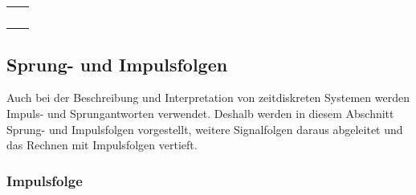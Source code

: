 \begin{table}[H]
{\begin{tabular}{| l | l |}
\parbox[c][0.8in][c]{3in}{} & 
\parbox[c][0.8in][c]{3in}{}\\ \hline

\parbox[c][0.64in][c]{3in}{} 
& \parbox[c][0.64in][c]{3in}{}\\ \hline

\parbox[c][0.64in][c]{3in}{} & \parbox[c][0.64in][c]{3in}{}\\ \hline

\parbox[c][0.64in][c]{3in}{} & 
\parbox[c][0.64in][c]{3in}{}\\ \hline

\parbox[c][0.64in][c]{3in}{} & \parbox[c][0.64in][c]{3in}{}\\ \hline

\parbox[c][0.64in][c]{3in}{} & \parbox[c][0.64in][c]{3in}{}\\ \hline

\end{tabular}%
}
\label{tab:threeone}
\end{table}

\clearpage

\subsection{Sprung- und Impulsfolgen}

\noindent Auch bei der Beschreibung und Interpretation von zeitdiskreten Systemen werden Impuls- und Sprungantworten verwendet. Deshalb werden in diesem Abschnitt Sprung- und Impulsfolgen vorgestellt, weitere Signalfolgen daraus abgeleitet und das Rechnen mit Impulsfolgen vertieft.

\subsubsection{Impulsfolge}

